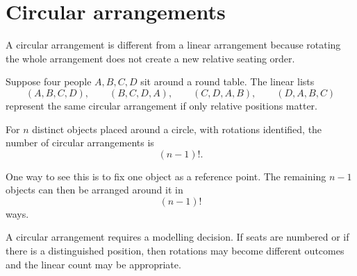 \section{Circular arrangements}

A circular arrangement is different from a linear arrangement because rotating the whole arrangement does not create a new relative seating order.

\begin{examplebox}
Suppose four people \(A,B,C,D\) sit around a round table. The linear lists
\[
(A,B,C,D),\qquad (B,C,D,A),\qquad (C,D,A,B),\qquad (D,A,B,C)
\]
represent the same circular arrangement if only relative positions matter.
\end{examplebox}

For \(n\) distinct objects placed around a circle, with rotations identified, the number of circular arrangements is
\[
(n-1)!.
\]

One way to see this is to fix one object as a reference point. The remaining \(n-1\) objects can then be arranged around it in
\[
(n-1)!
\]
ways.

\begin{remarkbox}
A circular arrangement requires a modelling decision. If seats are numbered or if there is a distinguished position, then rotations may become different outcomes and the linear count may be appropriate.
\end{remarkbox}
